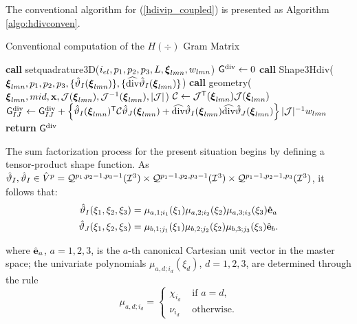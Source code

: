 The conventional algorithm for (\ref{hdivip_coupled}) is presented as Algorithm \ref{algo:hdivconven}.
% 
\begin{algorithm}[ht]
\caption{Conventional computation of the $H(\div)$ Gram Matrix}\label{algo:hdivconven}
\begin{algorithmic}
\State\textbf{call }setquadrature3D($i_{el},p_1,p_2,p_3,L,\boldsymbol{\xi}_{lmn},w_{lmn}$)
\State $\mathsf{G}^{\operatorname{div}} \gets 0$
            \State\textbf{call } Shape3Hdiv($\boldsymbol{\xi}_{lmn},p_1,p_2,p_3,\{\hat{\vartheta}_I(\boldsymbol{\xi}_{lmn})\},\{\widehat{\operatorname{div}}\hat{\vartheta}_I(\boldsymbol{\xi}_{lmn})\}$)
            \State\textbf{call } geometry( $\boldsymbol{\xi}_{lmn},mid,\mathbf{x},\mathcal{J}(\boldsymbol{\xi}_{lmn}),\mathcal{J}^{-1}(\boldsymbol{\xi}_{lmn}),|\mathcal{J}|$)
            \State $\mathcal{C}\gets\mathcal{J}^{\mathsf{T}}(\boldsymbol{\xi}_{lmn})\mathcal{J}(\boldsymbol{\xi}_{lmn})$
                    \State $\mathsf{G}_{IJ}^{\operatorname{div}} \gets \mathsf{G}_{IJ}^{\operatorname{div}}+\left\{\hat{\vartheta}_I(\boldsymbol{\xi}_{lmn})^{\mathsf{T}}\mathcal{C}\hat{\vartheta}_J(\boldsymbol{\xi}_{lmn})+\widehat{\operatorname{div}}\hat{\vartheta}_I(\boldsymbol{\xi}_{lmn})\widehat{\operatorname{div}}\hat{\vartheta}_J(\boldsymbol{\xi}_{lmn})\right\}|\mathcal{J}|^{-1}w_{lmn}$
                \EndFor
            \EndFor
\EndFor
\State \textbf{return} $\mathsf{G}^{\operatorname{div}}$
\EndProcedure
\end{algorithmic}
\end{algorithm}

The sum factorization process for the present situation begins by defining a tensor-product shape function. As $\hat{\vartheta}_I,\hat{\vartheta}_I\in \hat{V}^p=\mathcal{Q}^{p_1,p_2-1,p_3-1}(\mathcal{I}^3)\times\mathcal{Q}^{p_1-1,p_2,p_3-1}(\mathcal{I}^3)\times\mathcal{Q}^{p_1-1,p_2-1,p_3}(\mathcal{I}^3)$, it follows that:
\begin{equation}
    \begin{aligned}
    \hat{\vartheta}_I(\xi_1,\xi_2,\xi_3)&= \mu_{a,1;i_1}(\xi_1)\mu_{a,2;i_2}(\xi_2)\mu_{a,3;i_3}(\xi_3)\hat{\mathbf{e}}_a\\
    \hat{\vartheta}_J(\xi_1,\xi_2,\xi_3)&= \mu_{b,1;j_1}(\xi_1)\mu_{b,2;j_2}(\xi_2)\mu_{b,3;j_3}(\xi_3)\hat{\mathbf{e}}_b.
    \end{aligned}
    \label{hdivtensor}
\end{equation}

\noindent where $\hat{\mathbf{e}}_a$, $a=1,2,3$, is the $a$-th canonical Cartesian unit vector in the master space; the univariate polynomials $\mu_{a,d;i_d}(\xi_d)$, $d=1,2,3$, are determined through the rule
\begin{equation}
    \mu_{a,d;i_d}=  \begin{cases}
                    \chi_{i_d}&\text{ if }a=d,\\
                    \nu_{i_d} &\text{ otherwise.}
                    \end{cases}
    \label{hdivrule}
\end{equation}

